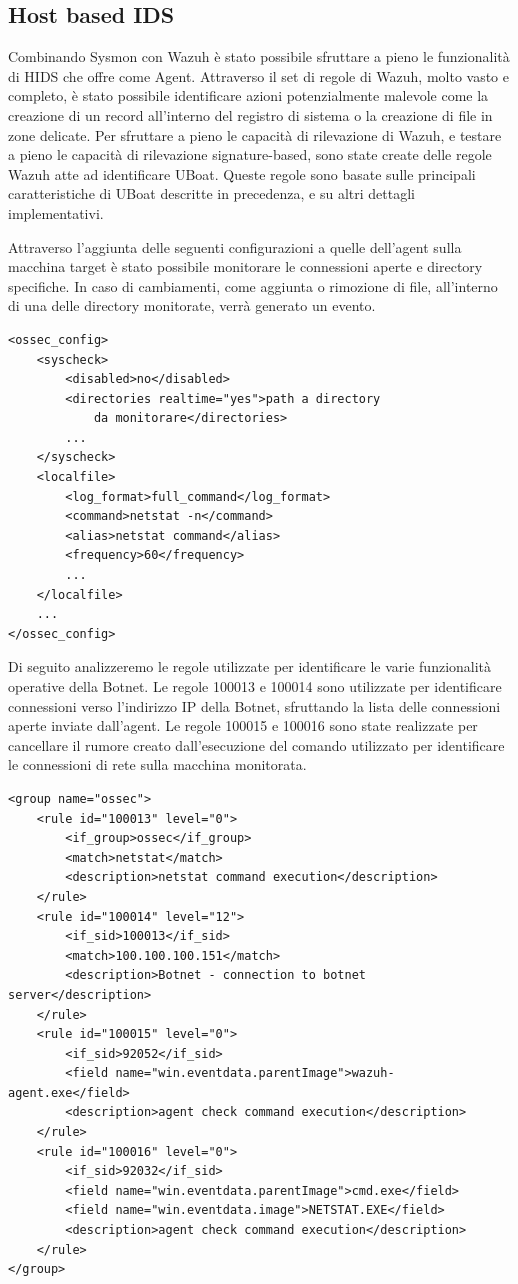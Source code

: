 \subsection{Host based IDS}
Combinando Sysmon con Wazuh è stato possibile sfruttare a pieno le funzionalità di HIDS che offre come Agent. Attraverso il set di regole di Wazuh, molto vasto e completo, è stato possibile identificare azioni potenzialmente malevole come la creazione di un record all'interno del registro di sistema o la creazione di file in zone delicate. Per sfruttare a pieno le capacità di rilevazione di Wazuh, e testare a pieno le capacità di rilevazione signature-based, sono state create delle regole Wazuh atte ad identificare UBoat.
Queste regole sono basate sulle principali caratteristiche di UBoat descritte in precedenza, e su altri dettagli implementativi.
\lstset{float,floatplacement=H,frame=none,tabsize=1,numbers=none}

Attraverso l'aggiunta delle seguenti configurazioni a quelle dell'agent sulla macchina target è stato possibile monitorare le connessioni aperte e  directory specifiche. In caso di cambiamenti, come aggiunta o rimozione di file, all'interno di una delle directory monitorate, verrà generato un evento.
\lstset{xleftmargin=1cm}
\begin{lstlisting}
<ossec_config>
    <syscheck>
        <disabled>no</disabled>
        <directories realtime="yes">path a directory 
            da monitorare</directories>
        ...
    </syscheck>
    <localfile>
        <log_format>full_command</log_format>
        <command>netstat -n</command>
        <alias>netstat command</alias>
        <frequency>60</frequency>
        ...
    </localfile>
    ...
</ossec_config>
\end{lstlisting}

Di seguito analizzeremo le regole utilizzate per identificare le varie funzionalità operative della Botnet.
Le regole 100013 e 100014 sono utilizzate per identificare connessioni verso l'indirizzo IP della Botnet, sfruttando la lista delle connessioni aperte inviate dall'agent. Le regole 100015 e 100016 sono state realizzate per cancellare il rumore creato dall'esecuzione del comando utilizzato per identificare le connessioni di rete sulla macchina monitorata.
\begin{lstlisting}
<group name="ossec">
    <rule id="100013" level="0">
        <if_group>ossec</if_group>
        <match>netstat</match>
        <description>netstat command execution</description>
    </rule>
    <rule id="100014" level="12">
        <if_sid>100013</if_sid>
        <match>100.100.100.151</match>
        <description>Botnet - connection to botnet server</description>
    </rule>
    <rule id="100015" level="0">
        <if_sid>92052</if_sid>
        <field name="win.eventdata.parentImage">wazuh-agent.exe</field>
        <description>agent check command execution</description>
    </rule>
    <rule id="100016" level="0">
        <if_sid>92032</if_sid>
        <field name="win.eventdata.parentImage">cmd.exe</field>
        <field name="win.eventdata.image">NETSTAT.EXE</field>
        <description>agent check command execution</description>
    </rule>
</group>
\end{lstlisting}

